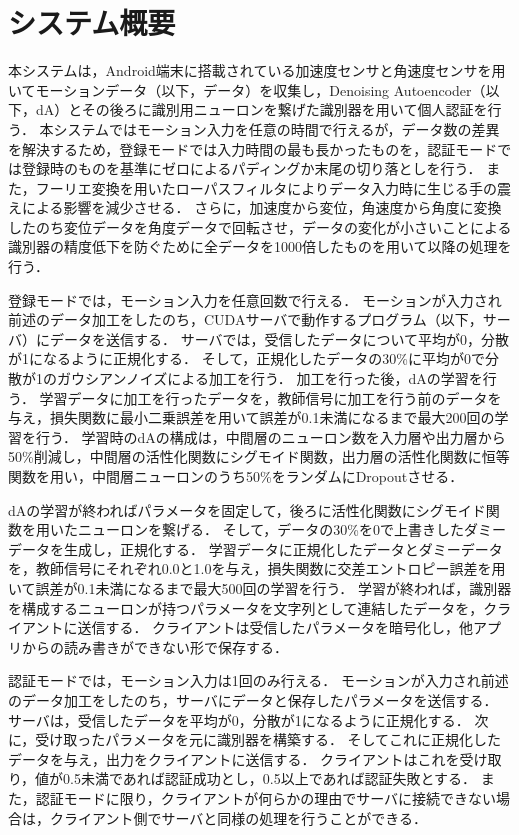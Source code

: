 \section{システム概要}
本システムは，Android端末に搭載されている加速度センサと角速度センサを用いてモーションデータ（以下，データ）を収集し，Denoising Autoencoder（以下，dA）とその後ろに識別用ニューロンを繋げた識別器を用いて個人認証を行う．
本システムではモーション入力を任意の時間で行えるが，データ数の差異を解決するため，登録モードでは入力時間の最も長かったものを，認証モードでは登録時のものを基準にゼロによるパディングか末尾の切り落としを行う．
また，フーリエ変換を用いたローパスフィルタによりデータ入力時に生じる手の震えによる影響を減少させる．
さらに，加速度から変位，角速度から角度に変換したのち変位データを角度データで回転させ，データの変化が小さいことによる識別器の精度低下を防ぐために全データを1000倍したものを用いて以降の処理を行う．

登録モードでは，モーション入力を任意回数で行える．
モーションが入力され前述のデータ加工をしたのち，CUDAサーバで動作するプログラム（以下，サーバ）にデータを送信する．
サーバでは，受信したデータについて平均が0，分散が1になるように正規化する．
そして，正規化したデータの30\%に平均が0で分散が1のガウシアンノイズによる加工を行う．
加工を行った後，dAの学習を行う．
学習データに加工を行ったデータを，教師信号に加工を行う前のデータを与え，損失関数に最小二乗誤差を用いて誤差が0.1未満になるまで最大200回の学習を行う．
学習時のdAの構成は，中間層のニューロン数を入力層や出力層から50\%削減し，中間層の活性化関数にシグモイド関数，出力層の活性化関数に恒等関数を用い，中間層ニューロンのうち50\%をランダムにDropoutさせる．

dAの学習が終わればパラメータを固定して，後ろに活性化関数にシグモイド関数を用いたニューロンを繋げる．
そして，データの30\%を0で上書きしたダミーデータを生成し，正規化する．
学習データに正規化したデータとダミーデータを，教師信号にそれぞれ0.0と1.0を与え，損失関数に交差エントロピー誤差を用いて誤差が0.1未満になるまで最大500回の学習を行う．
学習が終われば，識別器を構成するニューロンが持つパラメータを文字列として連結したデータを，クライアントに送信する．
クライアントは受信したパラメータを暗号化し，他アプリからの読み書きができない形で保存する．

認証モードでは，モーション入力は1回のみ行える．
モーションが入力され前述のデータ加工をしたのち，サーバにデータと保存したパラメータを送信する．
サーバは，受信したデータを平均が0，分散が1になるように正規化する．
次に，受け取ったパラメータを元に識別器を構築する．
そしてこれに正規化したデータを与え，出力をクライアントに送信する．
クライアントはこれを受け取り，値が0.5未満であれば認証成功とし，0.5以上であれば認証失敗とする．
また，認証モードに限り，クライアントが何らかの理由でサーバに接続できない場合は，クライアント側でサーバと同様の処理を行うことができる．
